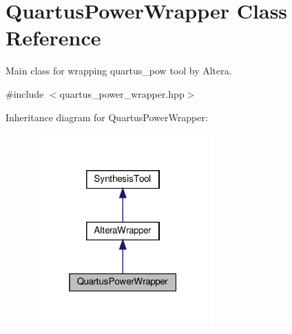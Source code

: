 \hypertarget{classQuartusPowerWrapper}{}\section{Quartus\+Power\+Wrapper Class Reference}
\label{classQuartusPowerWrapper}


Main class for wrapping quartus\+\_\+pow tool by Altera.  




{\ttfamily \#include $<$quartus\+\_\+power\+\_\+wrapper.\+hpp$>$}



Inheritance diagram for Quartus\+Power\+Wrapper\+:
\nopagebreak
\begin{figure}[H]
\begin{center}
\leavevmode
\includegraphics[width=196pt]{da/dce/classQuartusPowerWrapper__inherit__graph}
\end{center}
\end{figure}


